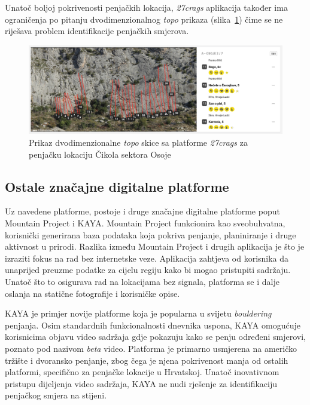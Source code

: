 Unatoč boljoj pokrivenosti penjačkih lokacija, \textit{27crags} aplikacija također ima ograničenja po pitanju dvodimenzionalnog \textit{topo} prikaza (slika~\ref{fig:cikola_27crags_topo}) čime se ne riješava problem identifikacije penjačkih smjerova.

\begin{figure}[H]
    \centering
    \includegraphics[width=1\textwidth]{images/analiza/cikola_27crags_topo.jpeg}
    \caption{Prikaz dvodimenzionalne \textit{topo} skice sa platforme \textit{27crags} za penjačku lokaciju Čikola sektora Osoje}
    \label{fig:cikola_27crags_topo}
\end{figure}

\subsection{Ostale značajne digitalne platforme}

Uz navedene platforme, postoje i druge značajne digitalne platforme poput Mountain Project i KAYA. Mountain Project funkcionira kao sveobuhvatna, korisnički generirana baza podataka koja pokriva penjanje, planiniranje i druge aktivnost u prirodi. Razlika između Mountain Project i drugih aplikacija je što je izraziti fokus na rad bez internetske veze. Aplikacija zahtjeva od korisnika da unaprijed preuzme podatke za cijelu regiju kako bi mogao pristupiti sadržaju. Unatoč što to osigurava rad na lokacijama bez signala, platforma se i dalje oslanja na statične fotografije i korisničke opise.

KAYA je primjer novije platforme koja je popularna u svijetu \textit{bouldering} penjanja. Osim standardnih funkcionalnosti dnevnika uspona, KAYA omogućuje korisnicima objavu video sadržaja gdje pokazuju kako se penju određeni smjerovi, poznato pod nazivom \textit{beta} video.  Platforma je primarno usmjerena na američko tržište i dvoransko penjanje, zbog čega je njena pokrivenost manja od ostalih platformi, specifično za penjačke lokacije u Hrvatskoj. Unatoč inovativnom pristupu dijeljenja video sadržaja, KAYA ne nudi rješenje za identifikaciju penjačkog smjera na stijeni.


